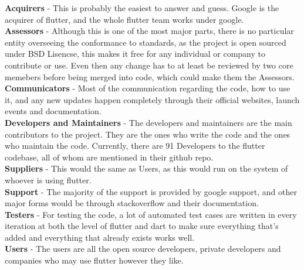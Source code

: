 \documentclass[conference, onecolumn]{IEEEtran}
\begin{document}
\textbf{Acquirers} - This is probably the easiest to answer and guess. Google is the acquirer of flutter, and the whole flutter team works under google. \\
\textbf{Assessors} - Although this is one of the most major parts, there is no particular entity overseeing the conformance to standards, as the project is open sourced under BSD Lisencse\cite{3ClauseBSDLicense}, this makes it free for any individual or company to contribute or use. Even then any change has to at least be reviewed by two core memebers before being merged into code, which could make them the Assessors. \\
\textbf{Communicators} - Most of the communication regarding the code, how to use it, and any new updates happen completely through their official websites, launch events and documentation. \\
\textbf{Developers and Maintainers} - The developers and maintainers are the main contributors to the project. They are the ones who write the code and the ones who maintain the code. Currently, there are 91 Developers to the flutter codebase, all of whom are mentioned in their github repo. \\
\textbf{Suppliers} - This would the same as Users, as this would run on the system of whoever is using flutter. \\
\textbf{Support} - The majority of the support is provided by google support, and other major forms would be through stackoverflow and their documentation. \\
\textbf{Testers} - For testing the code, a lot of automated test cases are written in every iteration at both the level of flutter and dart to make sure everything that's added and everything that already exists works well. \\
\textbf{Users} - The users are all the open source developers, private developers and companies who may use flutter however they like. \\
\end{document}
